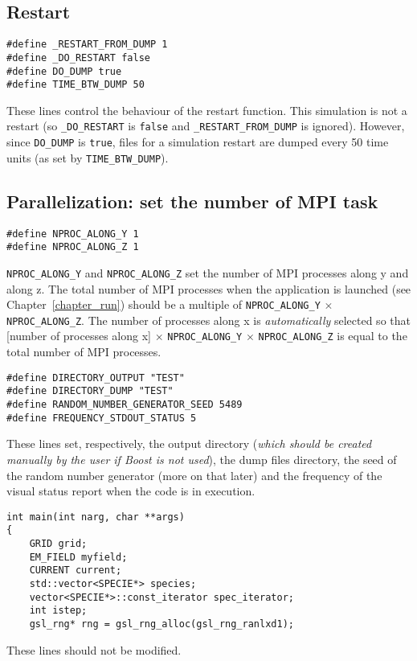 \documentclass[11pt,a4paper]{report}
\begin{document}
\subsection*{Restart}
\begin{lstlisting}
#define _RESTART_FROM_DUMP 1
#define _DO_RESTART false
#define DO_DUMP true
#define TIME_BTW_DUMP 50
\end{lstlisting}
These lines control the behaviour of the restart function.
This simulation is not a restart (so \verb+_DO_RESTART+ is \verb+false+ and \verb+_RESTART_FROM_DUMP+ is
ignored). However, since \verb+DO_DUMP+ is \verb+true+, files for a simulation restart are dumped every 50 time units (as set by \verb+TIME_BTW_DUMP+).

\subsection*{Parallelization: set the number of MPI task}
\begin{lstlisting}
#define NPROC_ALONG_Y 1
#define NPROC_ALONG_Z 1
\end{lstlisting}
\verb+NPROC_ALONG_Y+ and \verb+NPROC_ALONG_Z+ set the number of MPI processes along y and along z.
The total number of MPI processes when the application is launched (see Chapter~\ref{chapter_run}) should be a multiple of \verb+NPROC_ALONG_Y+ $\times$ \verb+NPROC_ALONG_Z+. The number of processes along x is \emph{automatically} selected so that [number of processes along x] $\times$ \verb+NPROC_ALONG_Y+ $\times$ \verb+NPROC_ALONG_Z+ is equal to the total number of MPI processes.
\begin{lstlisting}
#define DIRECTORY_OUTPUT "TEST"
#define DIRECTORY_DUMP "TEST"
#define RANDOM_NUMBER_GENERATOR_SEED 5489
#define FREQUENCY_STDOUT_STATUS 5
\end{lstlisting}
These lines set, respectively, the output directory (\emph{which should be created manually by the user if Boost is not used}), the dump files directory, the seed of the random number generator (more on that later) and the frequency of the visual status report when the code is in execution.
\begin{lstlisting}[backgroundcolor=\color{no_modify}]
int main(int narg, char **args)
{
	GRID grid;
	EM_FIELD myfield;
	CURRENT current;
	std::vector<SPECIE*> species;
	vector<SPECIE*>::const_iterator spec_iterator;
	int istep;
	gsl_rng* rng = gsl_rng_alloc(gsl_rng_ranlxd1);
\end{lstlisting}
These lines should not be modified.
\end{document}
